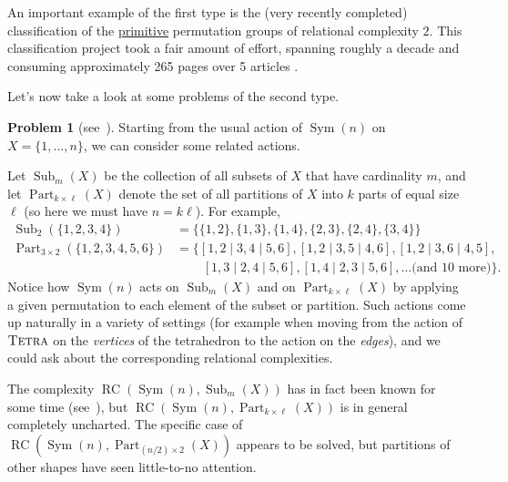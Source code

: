 \documentclass[11pt]{amsart}
\theoremstyle{plain}
\theoremstyle{definition}
\newtheorem*{problem*}{Problem}
\theoremstyle{remark}
\DeclareMathOperator{\Sym}{Sym}
\DeclareMathOperator{\Sub}{Sub}
\DeclareMathOperator{\Part}{Part}
\newcommand{\symtetra}{\textsc{Tetra}}
\DeclareMathOperator{\rc}{RC}
\begin{document}
An important example of the first type is the (very recently completed) classification of the \href{https://en.wikipedia.org/wiki/Primitive_permutation_group}{primitive} permutation groups of relational complexity $2$. This classification project took a fair amount of effort, spanning roughly a decade and consuming approximately 265 pages over 5 articles \cite{ChG16,WiJ16b, GiSp17,DGS18,GLS21}. 

Let's now take a look at some problems of the second type.

\begin{problem*}[{see~\cite[Example~5,Problem~2]{ChG00}}]
Starting from the usual action of $\Sym(n)$ on $X=\{1,\ldots,n\}$, we can consider some related actions. 

Let $\Sub_m(X)$ be the collection of all subsets of $X$ that have cardinality $m$, and let $\Part_{k\times \ell}(X)$ denote the set of all partitions of $X$ into $k$ parts of equal size $\ell$ (so here we must have $n=k\ell$). For example, 
\begin{align*}
\Sub_2(\{1,2,3,4\}) &= \{ \{1,2\}, \{1,3\}, \{1,4\}, \{2,3\}, \{2,4\}, \{3,4\}\}\\
\Part_{3\times 2}(\{1,2,3,4,5,6\}) & = \{ [1,2\mid3,4\mid5,6],[1,2\mid3,5\mid4,6],[1,2\mid3,6\mid4,5],\\
& \phantom{ = \{ }\; [1,3\mid2,4\mid5,6], [1,4\mid2,3\mid5,6], \ldots \text{(and $10$ more)}\}.
\end{align*}
Notice how $\Sym(n)$ acts on $\Sub_m(X)$ and on $\Part_{k\times \ell}(X)$ by applying a given permutation to each element of the subset or partition. Such actions come up naturally in a variety of settings (for example when moving from the action of $\symtetra$ on the \emph{vertices} of the tetrahedron to the action on the \emph{edges}), and we could ask about the corresponding relational complexities. 

The complexity $\rc(\Sym(n),\Sub_m(X))$ has in fact been known for some time (see~\cite[Theorem~2]{CMS96}), but $\rc(\Sym(n),\Part_{k\times \ell}(X))$ is in general completely uncharted. The specific case of  $\rc(\Sym(n),\Part_{(n/2)\times 2}(X))$ appears to be solved, but partitions of other shapes have seen little-to-no attention. 
\end{problem*}
\end{document}
